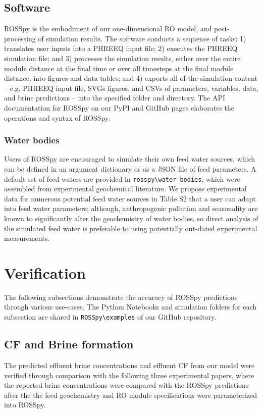 \subsection{Software}
ROSSpy is the embodiment of our one-dimensional RO model, and post-processing of simulation results. The software conducts a sequence of tasks: 1) translates user inputs into a PHREEQ input file; 2) executes the PHREEQ simulation file; and 3) processes the simulation results, either over the entire module distance at the final time or over all timesteps at the final module distance, into figures and data tables; and 4) exports all of the simulation content -- e.g. PHREEQ input file, SVGs figures, and CSVs of parameters, variables, data, and brine predictions -- into the specified folder and directory. The API documentation for ROSSpy on our PyPI and GitHub pages elaborates the operations and syntax of ROSSpy.


\subsubsection{Water bodies}
Users of ROSSpy are encouraged to simulate their own feed water sources, which can be defined in an argument dictionary or as a JSON file of feed parameters. A default set of feed waters are provided in \verb|rosspy\water_bodies|, which were assembled from experimental geochemical literature. We propose experimental data for numerous potential feed water sources in Table S2 that a user can adapt into feed water parameters; although, anthropogenic pollution \cite{Chen2008SourcesSea} and seasonality \cite{Sarthou2001SeasonalSea} are known to significantly alter the geochemistry of water bodies, so direct analysis of the simulated feed water is preferable to using potentially out-dated experimental measurements. 


\section{Verification}
The following subsections demonstrate the accuracy of ROSSpy predictions through various use-cases. The Python Notebooks and simulation folders for each subsection are shared in \verb|ROSSpy\examples| of our GitHub repository.


\subsection{CF and Brine formation}
The predicted effluent brine concentrations and effluent CF from our model were verified through comparison with the following three experimental papers, where the reported brine concentrations were compared with the ROSSpy predictions after the the feed geochemistry and RO module specifications were parameterized into ROSSpy. 

